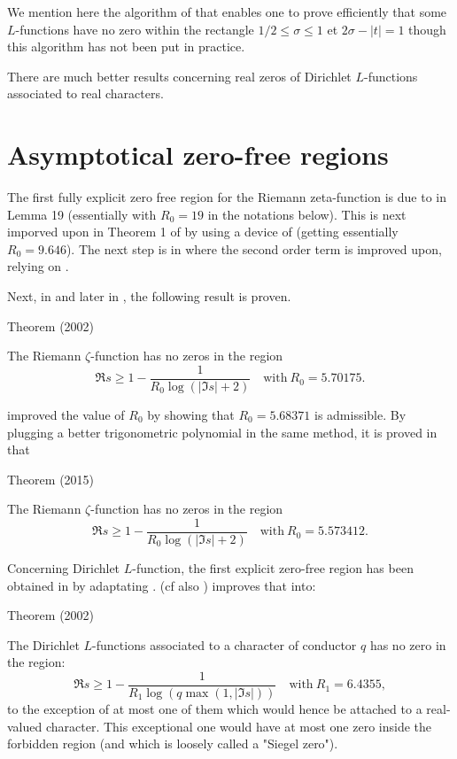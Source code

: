We mention here the algorithm of
\cite{Omar*01}
that enables one to prove efficiently that some $L$-functions have no zero
    within the rectangle
$1/2\le \sigma\le1$ et $2\sigma-|t|=1$ though this algorithm has not been put
    in practice.

There are much better results concerning real zeros of Dirichlet $L$-functions
    associated to real characters.


\section{Asymptotical zero-free regions}


The first fully explicit zero free region for the Riemann zeta-function is due
to \cite{Rosser*38} in Lemma 19 (essentially
with $R_0=19$ in the notations below). This is next imporved upon in Theorem 1
of \cite{Rosser-Schoenfeld*75}
by using a device of
\cite{Stechkin*70} (getting
essentially $R_0=9.646$).
The next step is in
\cite{Ramare-Rumely*96} 
where the second order term is improved upon, relying on
\cite{Stechkin*89}.

Next, in
\cite{Kadiri*02}
and later in
\cite{Kadiri*05},
the following result is proven.

\begin{thm}{Theorem (2002)}

  The Riemann $\zeta$-function has no zeros in the region
  $$
    \Re s \ge 1- \frac1{R_0 \log (| \Im s|+2)}\quad\text{with}\  R_0=5.70175.
  $$
\end{thm}



\cite{Jang-Kwon*14}
improved the value of $R_0$ by showing that $R_0=5.68371$ is admissible.
By plugging a better trigonometric polynomial in the same method,
it is proved in
\cite{Mossinghoff-Trudgian*15}
that

\begin{thm}{Theorem (2015)}

  The Riemann $\zeta$-function has no zeros in the region
  $$
    \Re s \ge 1- \frac1{R_0 \log (| \Im s|+2)}\quad\text{with}\  R_0=5.573412.
  $$
\end{thm}


Concerning Dirichlet $L$-function, the first explicit zero-free region has been obtained in
\cite{McCurley*84-1} by adaptating
\cite{Rosser-Schoenfeld*75}.
\cite{Kadiri*02} (cf also
\cite{Kadiri*02-2})
improves that into:

\begin{thm}{Theorem (2002)}

  The Dirichlet $L$-functions associated to a character of conductor $q$ has
  no zero in the region:
  $$
    \Re s \ge 1- \frac1{R_1 \log(q \max(1,| \Im s|))}  \quad\text{with}\
    R_1=6.4355, 
  $$
  to the exception of at most one of them which would hence be attached to a
  real-valued character. This exceptional one would have at most one zero
  inside the forbidden region (and which is loosely called a "Siegel zero").
\end{thm}

